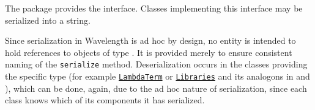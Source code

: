 The \texttt{} package provides the \texttt{}
interface. Classes implementing this interface may be serialized into a string.

Since serialization in Wavelength is ad hoc by design, no entity is intended to hold
references to objects of type \texttt{}. It is provided merely to
ensure consistent naming of the \texttt{serialize} method. Deserialization occurs
in the classes providing the specific type (for example \texttt{\hyperref[type:edu.kit.wavelength.client.model.term.LambdaTerm]{LambdaTerm}}
or \texttt{\hyperref[type:edu.kit.wavelength.client.model.library.Libraries]{Libraries}} and its analogons in \texttt{}
and \texttt{}), which can be done, again, due to the ad hoc nature
of serialization, since each class knows which of its components it has serialized.
